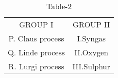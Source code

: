 \begin{table}[htbp]
       \centering
       \begin{tabular}{c|c}
       GROUP I & GROUP II \\
 P. Claus process & I.Syngas\\
 Q. Linde process & II.Oxygen\\
 R. Lurgi process & III.Sulphur\\
       \end{tabular}
       \caption{Table-2}
       \label{tab:tables/Table2.tex}
   \end{table}